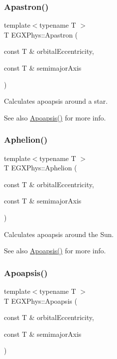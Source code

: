 \subsubsection{\texorpdfstring{Apastron()}{Apastron()}}
{\footnotesize\ttfamily template$<$typename T $>$ \\
T E\+G\+X\+Phys\+::\+Apastron (\begin{DoxyParamCaption}\item[{const T \&}]{orbital\+Eccentricity,  }\item[{const T \&}]{semimajor\+Axis }\end{DoxyParamCaption})}



Calculates apoapsis around a star. 

\begin{DoxySeeAlso}{See also}
\hyperlink{group___astrophysics_gaf962e650bf84a568458e8eb39b1c61ba}{Apoapsis()} for more info. 
\end{DoxySeeAlso}
\mbox{\label{group___astrophysics_ga77dadb4d082a441c8e85203c983722c7}} 
\subsubsection{\texorpdfstring{Aphelion()}{Aphelion()}}
{\footnotesize\ttfamily template$<$typename T $>$ \\
T E\+G\+X\+Phys\+::\+Aphelion (\begin{DoxyParamCaption}\item[{const T \&}]{orbital\+Eccentricity,  }\item[{const T \&}]{semimajor\+Axis }\end{DoxyParamCaption})}



Calculates apoapsis around the Sun. 

\begin{DoxySeeAlso}{See also}
\hyperlink{group___astrophysics_gaf962e650bf84a568458e8eb39b1c61ba}{Apoapsis()} for more info. 
\end{DoxySeeAlso}
\mbox{\label{group___astrophysics_gaf962e650bf84a568458e8eb39b1c61ba}} 
\subsubsection{\texorpdfstring{Apoapsis()}{Apoapsis()}}
{\footnotesize\ttfamily template$<$typename T $>$ \\
T E\+G\+X\+Phys\+::\+Apoapsis (\begin{DoxyParamCaption}\item[{const T \&}]{orbital\+Eccentricity,  }\item[{const T \&}]{semimajor\+Axis }\end{DoxyParamCaption})}



